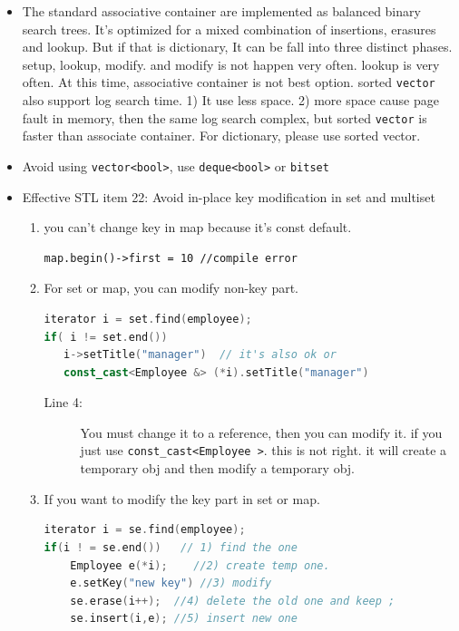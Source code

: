 \documentclass[a4paper,11pt,twoside]{book}
\begin{document}
\begin{itemize}
\item The standard associative container are implemented as balanced binary search trees.  It's optimized for a mixed combination of insertions, erasures and lookup.  But if that is dictionary, It can be fall into three distinct phases. setup, lookup, modify. and modify is not happen very often. lookup is very often. At this time, associative container is not best option. sorted \texttt{vector} also support log search time.  1) It use less space. 2) more space cause page fault in memory, then the same log search complex, but sorted \texttt{vector} is faster than associate container. For dictionary, please use sorted vector.


\item Avoid using \texttt{vector<bool>}, use \texttt{deque<bool>} or \texttt{bitset}


\item Effective STL item 22: Avoid in-place key modification in set and multiset
\begin{enumerate}
   \item you can't change key in map because it's const default.
\begin{lstlisting}[numbers=none]
map.begin()->first = 10 //compile error
\end{lstlisting}

   \item For set or map, you can modify non-key part.
\begin{lstlisting}[frame=single, language=c++]
iterator i = set.find(employee);
if( i != set.end())
   i->setTitle("manager")  // it's also ok or
   const_cast<Employee &> (*i).setTitle("manager")
\end{lstlisting}
\begin{description}
	\item[Line 4:]  You must change it to a reference, then you can modify it. if you just use \texttt{const\_cast<Employee >}. this is not right. it will create a temporary obj and then modify a temporary obj.
\end{description}

\item If you want to modify the key part in set or map.
\begin{lstlisting}[frame=single, language=c++]
iterator i = se.find(employee); 
if(i ! = se.end())   // 1) find the one
	Employee e(*i);    //2) create temp one.
	e.setKey("new key") //3) modify
	se.erase(i++);  //4) delete the old one and keep ;
	se.insert(i,e); //5) insert new one
\end{lstlisting}
 \end{enumerate}


\end{itemize}
\end{document}
